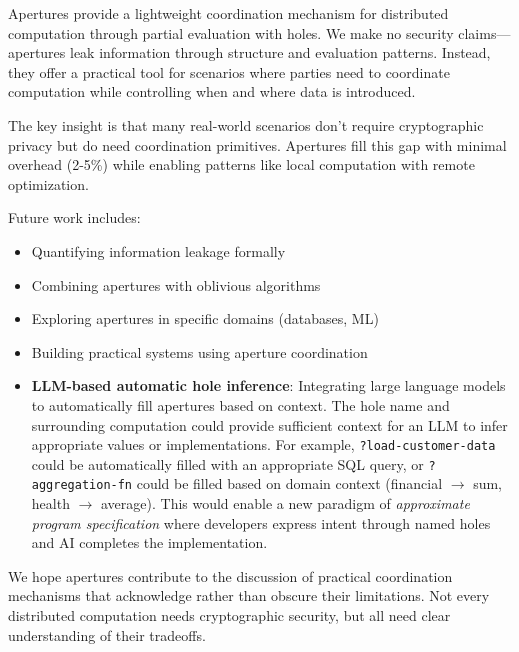 \documentclass[10pt]{article}
\begin{document}
Apertures provide a lightweight coordination mechanism for distributed computation through partial evaluation with holes. We make no security claims—apertures leak information through structure and evaluation patterns. Instead, they offer a practical tool for scenarios where parties need to coordinate computation while controlling when and where data is introduced.

The key insight is that many real-world scenarios don't require cryptographic privacy but do need coordination primitives. Apertures fill this gap with minimal overhead (2-5\%) while enabling patterns like local computation with remote optimization.

Future work includes:
\begin{itemize}
\item Quantifying information leakage formally
\item Combining apertures with oblivious algorithms
\item Exploring apertures in specific domains (databases, ML)
\item Building practical systems using aperture coordination
\item \textbf{LLM-based automatic hole inference}: Integrating large language models to automatically fill apertures based on context. The hole name and surrounding computation could provide sufficient context for an LLM to infer appropriate values or implementations. For example, \texttt{?load-customer-data} could be automatically filled with an appropriate SQL query, or \texttt{?aggregation-fn} could be filled based on domain context (financial $\rightarrow$ sum, health $\rightarrow$ average). This would enable a new paradigm of \emph{approximate program specification} where developers express intent through named holes and AI completes the implementation.
\end{itemize}

We hope apertures contribute to the discussion of practical coordination mechanisms that acknowledge rather than obscure their limitations. Not every distributed computation needs cryptographic security, but all need clear understanding of their tradeoffs.



\end{document}
